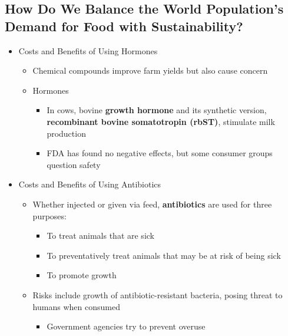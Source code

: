 \documentclass[12pt]{article}
\begin{document}
        \subsection{How Do We Balance the World Population's Demand for Food with Sustainability?}
            \begin{itemize}
                \item Costs and Benefits of Using Hormones
                    \begin{itemize}
                        \item Chemical compounds improve farm yields but also cause concern
                        \item Hormones
                            \begin{itemize}
                                \item In cows, bovine \textbf{growth hormone} and its synthetic version, \textbf{recombinant bovine somatotropin (rbST)}, stimulate milk production
                                \item FDA has found no negative effects, but some consumer groups question safety
                            \end{itemize}
                    \end{itemize}
                \item Costs and Benefits of Using Antibiotics
                    \begin{itemize}
                        \item Whether injected or given via feed, \textbf{antibiotics} are used for three purposes:
                            \begin{itemize}
                                \item To treat animals that are sick
                                \item To preventatively treat animals that may be at risk of being sick
                                \item To promote growth
                            \end{itemize}
                        \item Risks include growth of antibiotic-resistant bacteria, posing threat to humans when consumed
                            \begin{itemize}
                                \item Government agencies try to prevent overuse
                            \end{itemize}

\end{itemize}
\end{itemize}
\end{document}
